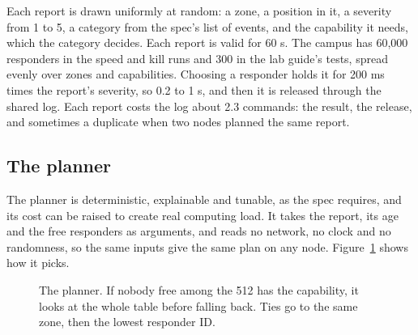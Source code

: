 Each report is drawn uniformly at random: a zone, a position in it, a severity from 1 to 5, a category from the spec's list of events, and the capability it needs, which the category decides. Each report is valid for 60 s. The campus has 60,000 responders in the speed and kill runs and 300 in the lab guide's tests, spread evenly over zones and capabilities. Choosing a responder holds it for 200 ms times the report's severity, so 0.2 to 1 s, and then it is released through the shared log. Each report costs the log about 2.3 commands: the result, the release, and sometimes a duplicate when two nodes planned the same report.

\subsection{The planner}

The planner is deterministic, explainable and tunable, as the spec requires, and its cost can be raised to create real computing load. It takes the report, its age and the free responders as arguments, and reads no network, no clock and no randomness, so the same inputs give the same plan on any node. Figure~\ref{fig:planner} shows how it picks.

\begin{figure}[!htb]
\centering
{}
\caption{The planner. If nobody free among the 512 has the capability, it looks at the whole table before falling back. Ties go to the same zone, then the lowest responder ID.}
\label{fig:planner}
\end{figure}


